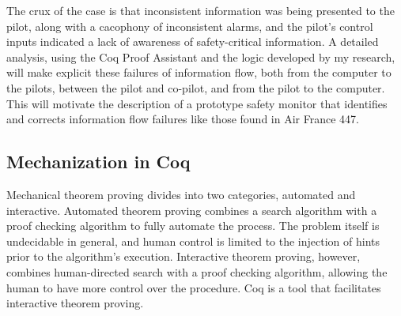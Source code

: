 

The crux of the case is that inconsistent information was being presented to the pilot, along with a cacophony of inconsistent alarms, and the pilot's control inputs indicated a lack of awareness of safety-critical information. A detailed analysis, using the Coq Proof Assistant and the logic developed by my research, will make explicit these failures of information flow, both from the computer to the pilots, between the pilot and co-pilot, and from the pilot to the computer. This will motivate the description of a prototype safety monitor that identifies and corrects information flow failures like those found in Air France 447.




\subsection{Mechanization in Coq}
Mechanical theorem proving divides into two categories, automated and interactive. Automated theorem proving combines a search algorithm with a proof checking algorithm to fully automate the process. The problem itself is undecidable in general, and human control is limited to the injection of hints prior to the algorithm's execution. Interactive theorem proving, however, combines human-directed search with a proof checking algorithm, allowing the human to have more control over the procedure. Coq is a tool that facilitates interactive theorem proving.

